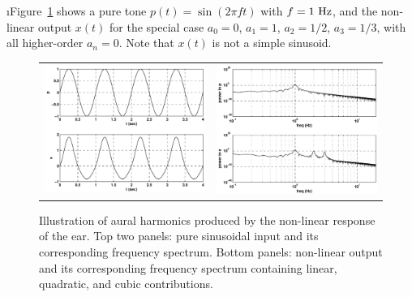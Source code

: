 \i Figure~\ref{f:auralharmonics-pure} 
shows a pure tone $p(t) = \sin(2\pi f t)$ 
with $f=1~{\rm Hz}$, and the non-linear 
output $x(t)$ for the special case $a_0=0$, $a_1=1$,
$a_2=1/2$, $a_3=1/3$, with all higher-order 
$a_n=0$.
Note that $x(t)$ is not a simple sinusoid.
%
\begin{figure}[htbp]
\begin{center}
\begin{tabular}{cc}
\includegraphics[width=.45\textwidth]{auralharmonicstime_pure} &
\includegraphics[width=.45\textwidth]{auralharmonicsfreq_pure}
\end{tabular}
\caption{Illustration of aural harmonics produced by
the non-linear response of the ear.
Top two panels: pure sinusoidal input and its corresponding
frequency spectrum.
Bottom panels: non-linear output and its corresponding 
frequency spectrum containing linear, quadratic, and cubic contributions.}
\label{f:auralharmonics-pure}
\end{center}
\end{figure}
%
